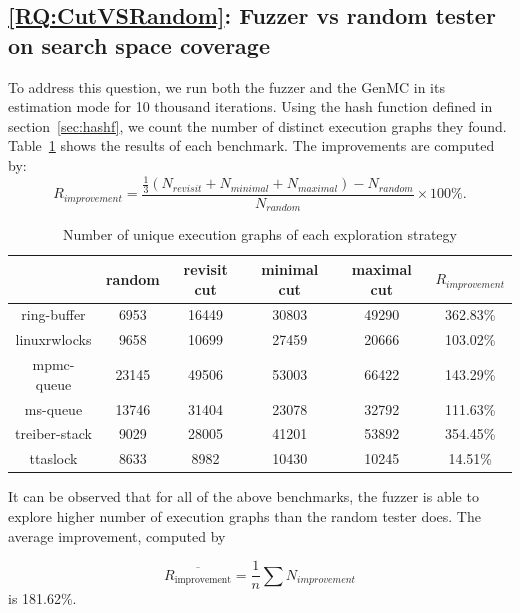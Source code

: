 \subsection{\ref*{RQ:CutVSRandom}: Fuzzer vs random tester on search space coverage}

To address this question, we run both the fuzzer and the GenMC in its estimation mode for 10 thousand iterations. Using the hash function defined in section~\ref{sec:hashf}, we count the number of distinct execution graphs they found. Table~\ref{genmc:num-of-exe} shows the results of each benchmark. The improvements are computed by:
\[
	R_{improvement} = \frac{\frac{1}{3} (N_{revisit}+N_{minimal}+N_{maximal}) - N_{random} }{N_{random}} \times 100 \%.
\]

\begin{table}[h!]
	\centering
	\begin{tabular}{|c|cccc|c|}
		\hline
		\diagbox{Benchmark}{ Strategy} & random & revisit cut & minimal cut & maximal cut & $R_{improvement}$ \\ \hline
		ring-buffer                    & 6953   & 16449       & 30803       & 49290       & 362.83\%          \\ \hline
		linuxrwlocks                   & 9658   & 10699       & 27459       & 20666       & 103.02\%          \\ \hline
		mpmc-queue                     & 23145  & 49506       & 53003       & 66422       & 143.29\%          \\ \hline
		ms-queue                       & 13746  & 31404       & 23078       & 32792       & 111.63\%          \\ \hline
		treiber-stack                  & 9029   & 28005       & 41201       & 53892       & 354.45\%          \\ \hline
		ttaslock                       & 8633   & 8982        & 10430       & 10245       & 14.51\%           \\ \hline
	\end{tabular}
	\label{genmc:num-of-exe}
	\caption{Number of unique execution graphs of each exploration strategy}
\end{table}

It can be observed that for all of the above benchmarks, the fuzzer is able to explore higher number of execution graphs than the random tester does. The average improvement, computed by


\[
	\overline{R_{\text{improvement}}} = \frac{1}{n} \sum N_{improvement}
\]
is 181.62\%.

